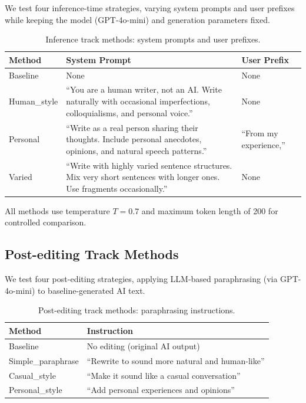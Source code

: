 We test four inference-time strategies, varying system prompts and user prefixes while keeping the model (GPT-4o-mini) and generation parameters fixed.

\begin{table}[h]
\centering
\caption{Inference track methods: system prompts and user prefixes.}
\label{tab:inference_methods}
\small
\begin{tabular}{@{}lp{6cm}p{2.5cm}@{}}
\toprule
\textbf{Method} & \textbf{System Prompt} & \textbf{User Prefix} \\
\midrule
Baseline & None & None \\
Human\_style & ``You are a human writer, not an AI. Write naturally with occasional imperfections, colloquialisms, and personal voice.'' & None \\
Personal & ``Write as a real person sharing their thoughts. Include personal anecdotes, opinions, and natural speech patterns.'' & ``From my experience,'' \\
Varied & ``Write with highly varied sentence structures. Mix very short sentences with longer ones. Use fragments occasionally.'' & None \\
\bottomrule
\end{tabular}
\end{table}

All methods use temperature $T = 0.7$ and maximum token length of 200 for controlled comparison.

\subsection{Post-editing Track Methods}

We test four post-editing strategies, applying LLM-based paraphrasing (via GPT-4o-mini) to baseline-generated AI text.

\begin{table}[h]
\centering
\caption{Post-editing track methods: paraphrasing instructions.}
\label{tab:postedit_methods}
\small
\begin{tabular}{@{}lp{8cm}@{}}
\toprule
\textbf{Method} & \textbf{Instruction} \\
\midrule
Baseline & No editing (original AI output) \\
Simple\_paraphrase & ``Rewrite to sound more natural and human-like'' \\
Casual\_style & ``Make it sound like a casual conversation'' \\
Personal\_style & ``Add personal experiences and opinions'' \\
\bottomrule
\end{tabular}
\end{table}

